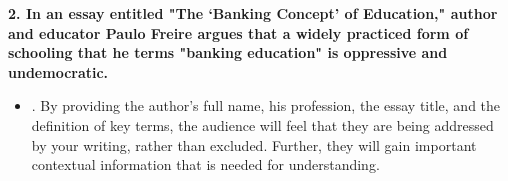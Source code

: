 \textbf{2. In an essay entitled "The `Banking Concept' of Education," author and educator Paulo Freire argues that a widely practiced form of schooling that he terms "banking education" is oppressive and undemocratic.}

\begin{itemize}

\item {}. By
providing the author's full name, his profession, the essay title, and the
definition of key terms, the audience will feel that they are being addressed by
your writing, rather than excluded. Further, they will gain important contextual
information that is needed for understanding.

\end{itemize}
